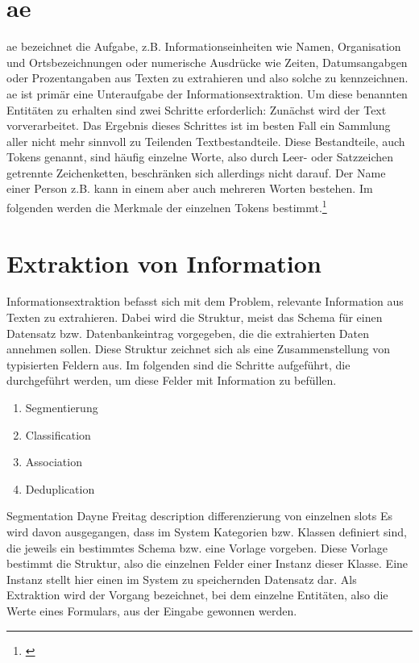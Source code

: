 \section{\Acrfull{ae}}
\gls{ae} bezeichnet die Aufgabe, z.B. Informationseinheiten wie Namen, Organisation und Ortsbezeichnungen oder numerische Ausdrücke wie Zeiten, Datumsangabgen oder Prozentangaben aus Texten zu extrahieren und also solche zu kennzeichnen. \gls{ae} ist primär eine Unteraufgabe der Informationsextraktion\cite{manning2012information}. Um diese benannten Entitäten zu erhalten sind zwei Schritte erforderlich: Zunächst wird der Text vorverarbeitet. Das Ergebnis dieses Schrittes ist im besten Fall ein Sammlung aller nicht mehr sinnvoll zu Teilenden Textbestandteile. Diese Bestandteile, auch Tokens genannt, sind häufig einzelne Worte, also durch Leer- oder Satzzeichen getrennte Zeichenketten, beschränken sich allerdings nicht darauf. Der Name einer Person z.B. kann in einem aber auch mehreren Worten bestehen. Im folgenden werden die Merkmale der einzelnen Tokens bestimmt.\footnote{\cite{nadeau2007survey}}

\section{Extraktion von Information}
Informationsextraktion befasst sich mit dem Problem, relevante Information aus Texten zu extrahieren. Dabei wird die Struktur, meist das Schema für einen Datensatz bzw. Datenbankeintrag vorgegeben, die die extrahierten Daten annehmen sollen. Diese Struktur zeichnet sich als eine Zusammenstellung von typisierten Feldern aus. Im folgenden sind die Schritte aufgeführt, die durchgeführt werden, um diese Felder mit Information zu befüllen.
\begin{enumerate}
	\item Segmentierung
	\item Classification
	\item Association
	\item Deduplication
\end{enumerate}
\cite{mccallum2005information}
Segmentation 
Dayne Freitag description
differenzierung von einzelnen slots
Es wird davon ausgegangen, dass im System Kategorien bzw. Klassen definiert sind, die jeweils ein bestimmtes Schema bzw. eine Vorlage vorgeben. Diese Vorlage bestimmt die Struktur, also die einzelnen Felder einer Instanz dieser Klasse. Eine Instanz stellt hier einen im System zu speichernden Datensatz dar. Als Extraktion wird der Vorgang bezeichnet, bei dem einzelne Entitäten, also die Werte eines Formulars, aus der Eingabe gewonnen werden.


